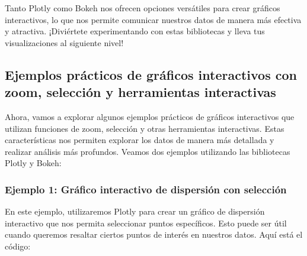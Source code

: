 \documentclass[
  a4paper,
]{article}
\begin{document}
Tanto Plotly como Bokeh nos ofrecen opciones versátiles para crear
gráficos interactivos, lo que nos permite comunicar nuestros datos de
manera más efectiva y atractiva. ¡Diviértete experimentando con estas
bibliotecas y lleva tus visualizaciones al siguiente nivel!

\hypertarget{ejemplos-pruxe1cticos-de-gruxe1ficos-interactivos-con-zoom-selecciuxf3n-y-herramientas-interactivas}{%
\subsection{Ejemplos prácticos de gráficos interactivos con zoom,
selección y herramientas
interactivas}\label{ejemplos-pruxe1cticos-de-gruxe1ficos-interactivos-con-zoom-selecciuxf3n-y-herramientas-interactivas}}

Ahora, vamos a explorar algunos ejemplos prácticos de gráficos
interactivos que utilizan funciones de zoom, selección y otras
herramientas interactivas. Estas características nos permiten explorar
los datos de manera más detallada y realizar análisis más profundos.
Veamos dos ejemplos utilizando las bibliotecas Plotly y Bokeh:

\hypertarget{ejemplo-1-gruxe1fico-interactivo-de-dispersiuxf3n-con-selecciuxf3n}{%
\subsubsection{Ejemplo 1: Gráfico interactivo de dispersión con
selección}\label{ejemplo-1-gruxe1fico-interactivo-de-dispersiuxf3n-con-selecciuxf3n}}

En este ejemplo, utilizaremos Plotly para crear un gráfico de dispersión
interactivo que nos permita seleccionar puntos específicos. Esto puede
ser útil cuando queremos resaltar ciertos puntos de interés en nuestros
datos. Aquí está el código:
\end{document}
